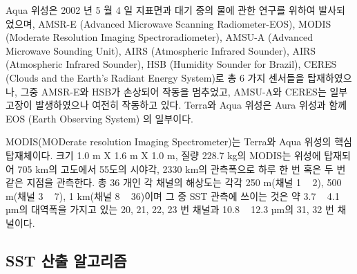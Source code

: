 Aqua 위성은 2002 년 5 월 4 일 지표면과 대기 중의 물에 관한 연구를 위하여 발사되었으며, AMSR-E (Advanced Microwave Scanning Radiometer-EOS), MODIS (Moderate Resolution Imaging Spectroradiometer), AMSU-A (Advanced Microwave Sounding Unit), AIRS (Atmospheric Infrared Sounder), AIRS (Atmospheric Infrared Sounder), HSB (Humidity Sounder for Brazil), CERES (Clouds and the Earth's Radiant Energy System)로 총 6 가지 센서들을 탑재하였으나, 그중 AMSR-E와 HSB가 손상되어 작동을 멈추었고, AMSU-A와 CERES는 일부 고장이 발생하였으나 여전히 작동하고 있다. Terra와 Aqua 위성은 Aura 위성과 함께 EOS (Earth Observing System) 의 일부이다. 

MODIS(MODerate resolution Imaging Spectrometer)는 Terra와 Aqua 위성의 핵심 탑재체이다. 크기 1.0 m X 1.6 m X 1.0 m, 질량 228.7 kg의 MODIS는 위성에 탑재되어 705 km의 고도에서 55도의 시야각, 2330 km의 관측폭으로 하루 한 번 혹은 두 번 같은 지점을 관측한다. 총 36 개인 각 채널의 해상도는 각각 250 m(채널 1 ~ 2), 500 m(채널 3 ~ 7), 1 km(채널 8 ~ 36)이며 그 중 SST 관측에 쓰이는 것은 약 3.7 ~ 4.1 µm의 대역폭을 가지고 있는 20, 21, 22, 23 번 채널과 10.8 ~ 12.3 µm의 31, 32 번 채널이다.

\subsection{SST 산출 알고리즘}